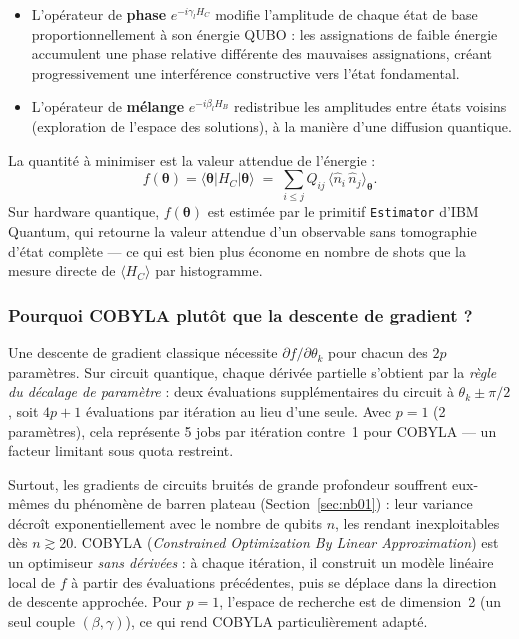 \documentclass[12pt,a4paper]{article}
\begin{document}
\begin{itemize}
  \item L'opérateur de \textbf{phase} $e^{-i\gamma_l H_C}$ modifie l'amplitude
    de chaque état de base proportionnellement à son énergie QUBO : les
    assignations de faible énergie accumulent une phase relative différente des
    mauvaises assignations, créant progressivement une interférence constructive
    vers l'état fondamental.
  \item L'opérateur de \textbf{mélange} $e^{-i\beta_l H_B}$ redistribue les
    amplitudes entre états voisins (exploration de l'espace des solutions),
    à la manière d'une diffusion quantique.
\end{itemize}

La quantité à minimiser est la valeur attendue de l'énergie :
\begin{equation}
  f(\bm{\theta}) = \langle\bm{\theta}|H_C|\bm{\theta}\rangle
  \;=\; \sum_{i \leq j} Q_{ij}\,
  \bigl\langle\hat{n}_i\,\hat{n}_j\bigr\rangle_{\!\bm{\theta}}.
  \label{eq:cost}
\end{equation}
Sur hardware quantique, $f(\bm{\theta})$ est estimée par le primitif
\texttt{Estimator} d'IBM Quantum, qui retourne la valeur attendue d'un observable
sans tomographie d'état complète --- ce qui est bien plus économe en nombre de
shots que la mesure directe de $\langle H_C \rangle$ par histogramme.

\subsubsection{Pourquoi COBYLA plutôt que la descente de gradient ?}

Une descente de gradient classique nécessite $\partial f / \partial \theta_k$
pour chacun des $2p$ paramètres.
Sur circuit quantique, chaque dérivée partielle s'obtient par la
\emph{règle du décalage de paramètre} : deux évaluations supplémentaires
du circuit à $\theta_k \pm \pi/2$, soit $4p + 1$ évaluations par
itération au lieu d'une seule.
Avec $p=1$ (2 paramètres), cela représente 5 jobs par itération contre~1
pour COBYLA --- un facteur limitant sous quota restreint.

Surtout, les gradients de circuits bruités de grande profondeur souffrent
eux-mêmes du phénomène de barren plateau (Section~\ref{sec:nb01}) : leur
variance décroît exponentiellement avec le nombre de qubits $n$, les rendant
inexploitables dès $n \gtrsim 20$.
COBYLA (\emph{Constrained Optimization By Linear Approximation}) est un
optimiseur \emph{sans dérivées} : à chaque itération, il construit un modèle
linéaire local de $f$ à partir des évaluations précédentes, puis se déplace
dans la direction de descente approchée.
Pour $p=1$, l'espace de recherche est de dimension~2 (un seul couple
$(\beta,\gamma)$), ce qui rend COBYLA particulièrement adapté.
\end{document}
